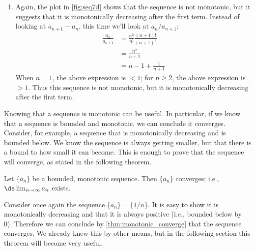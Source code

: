 {\begin{enumerate}
\item
%
%
	Again, the plot in \autoref{fig:seq7d} shows that the sequence is not monotonic, but it suggests that it is monotonically decreasing after the first term. Instead of looking at $a_{n+1}-a_n$, this time we'll look at $a_n/a_{n+1}$:
\begin{align*}
	\frac{a_n}{a_{n+1}} &= \frac{n^2}{n!}\frac{(n+1)!}{(n+1)^2} \\
	&= \frac{n^2}{n+1} \\
	&= n-1+\frac1{n+1}
\end{align*}
When $n=1$, the above expression is $<1$; for $n\geq 2$, the above expression is $>1$. Thus this sequence is not monotonic, but it is monotonically decreasing after the first term.\eoehere
\end{enumerate}}

Knowing that a sequence is monotonic can be useful. In particular, if we know that a sequence is bounded and monotonic, we can conclude it converges. Consider, for example, a sequence that is monotonically decreasing and is bound\-ed below. We know the sequence is always getting smaller, but that there is a bound to how small it can become. This is enough to prove that the sequence will converge, as stated in the following theorem.

{Let $\{a_n\}$ be a bounded, monotonic sequence. Then $\{a_n\}$ converges; i.e., $\ds \lim_{n \to\infty}a_n$ exists.
}

Consider once again the sequence $\{a_n\} = \{1/n\}$. It is easy to show it is monotonically decreasing and that it is always positive (i.e., bounded below by 0). Therefore we can conclude by \autoref{thm:monotonic_converge} that the sequence converges. We already knew this by other means, but in the following section this theorem will become very useful.

